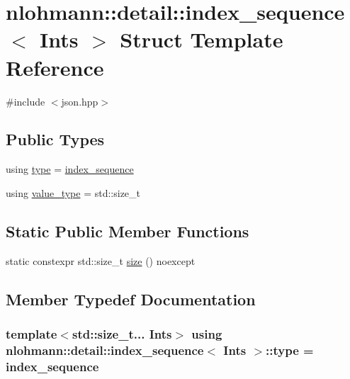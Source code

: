 \hypertarget{structnlohmann_1_1detail_1_1index__sequence}{}\section{nlohmann\+:\+:detail\+:\+:index\+\_\+sequence$<$ Ints $>$ Struct Template Reference}
\label{structnlohmann_1_1detail_1_1index__sequence}


{\ttfamily \#include $<$json.\+hpp$>$}

\subsection*{Public Types}
\begin{DoxyCompactItemize}
\item 
using \hyperlink{structnlohmann_1_1detail_1_1index__sequence_a3c14c4ab277de72b166806193ff4fa10}{type} = \hyperlink{structnlohmann_1_1detail_1_1index__sequence}{index\+\_\+sequence}
\item 
using \hyperlink{structnlohmann_1_1detail_1_1index__sequence_a2eca43d08fc1eb68bd5fa75b6714d21d}{value\+\_\+type} = std\+::size\+\_\+t
\end{DoxyCompactItemize}
\subsection*{Static Public Member Functions}
\begin{DoxyCompactItemize}
\item 
static constexpr std\+::size\+\_\+t \hyperlink{structnlohmann_1_1detail_1_1index__sequence_a7ac529419787d775f52408135304b337}{size} () noexcept
\end{DoxyCompactItemize}


\subsection{Member Typedef Documentation}
\subsubsection[{\texorpdfstring{type}{type}}]{\setlength{\rightskip}{0pt plus 5cm}template$<$std\+::size\+\_\+t... Ints$>$ using {\bf nlohmann\+::detail\+::index\+\_\+sequence}$<$ Ints $>$\+::{\bf type} =  {\bf index\+\_\+sequence}}\hypertarget{structnlohmann_1_1detail_1_1index__sequence_a3c14c4ab277de72b166806193ff4fa10}{}\label{structnlohmann_1_1detail_1_1index__sequence_a3c14c4ab277de72b166806193ff4fa10}

